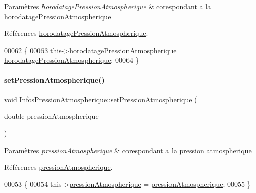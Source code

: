 \begin{DoxyParams}{Paramètres}
{\em horodatage\+Pression\+Atmospherique} & corespondant a la horodatage\+Pression\+Atmospherique \\
\hline
\end{DoxyParams}


Références \hyperlink{class_infos_pression_atmospherique_aba207458a51a9290e4f2e0795983a44e}{horodatage\+Pression\+Atmospherique}.


\begin{DoxyCode}
00062 \{
00063     this->\hyperlink{class_infos_pression_atmospherique_aba207458a51a9290e4f2e0795983a44e}{horodatagePressionAtmospherique} = 
      \hyperlink{class_infos_pression_atmospherique_aba207458a51a9290e4f2e0795983a44e}{horodatagePressionAtmospherique};
00064 \}
\end{DoxyCode}
\mbox{\label{class_infos_pression_atmospherique_ab598771e222fbca604ac6dba5d2aacb9}} 
\paragraph{\texorpdfstring{set\+Pression\+Atmospherique()}{setPressionAtmospherique()}}
{\footnotesize\ttfamily void Infos\+Pression\+Atmospherique\+::set\+Pression\+Atmospherique (\begin{DoxyParamCaption}\item[{double}]{pression\+Atmospherique }\end{DoxyParamCaption})}


\begin{DoxyParams}{Paramètres}
{\em pression\+Atmospherique} & corespondant a la pression atmospherique \\
\hline
\end{DoxyParams}


Références \hyperlink{class_infos_pression_atmospherique_a69f31dc0d0ef59f8ced23e4663ee1ab8}{pression\+Atmospherique}.


\begin{DoxyCode}
00053 \{
00054     this->\hyperlink{class_infos_pression_atmospherique_a69f31dc0d0ef59f8ced23e4663ee1ab8}{pressionAtmospherique} = \hyperlink{class_infos_pression_atmospherique_a69f31dc0d0ef59f8ced23e4663ee1ab8}{pressionAtmospherique};
00055 \}
\end{DoxyCode}
\mbox{\label{class_infos_pression_atmospherique_af759842c05a1e59b56d433e823bee341}} 
